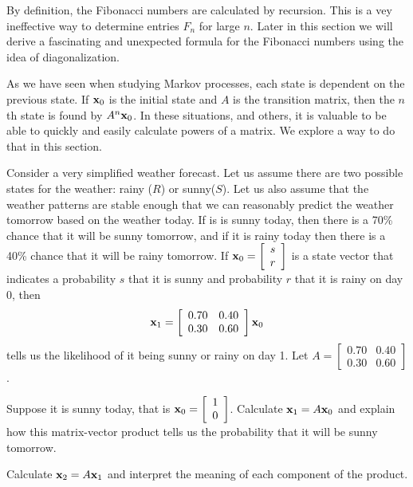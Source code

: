 By definition, the Fibonacci numbers are calculated by recursion. This is a vey ineffective way to determine entries $F_n$ for large $n$. Later in this section we will derive a fascinating and unexpected formula for the Fibonacci numbers using the idea of diagonalization. 



As we have seen when studying Markov processes, each state is dependent on the previous state. If $\mathbf{x}_0$ is the initial state and $A$ is the transition matrix, then the $n$th state is found by $A^n \mathbf{x}_0$. In these situations, and others, it is valuable to be able to quickly and easily calculate powers of a matrix. We explore a way to do that in this section. 

\begin{pa} \label{pa:4_c} Consider a very simplified weather forecast. Let us assume there are two possible states for the weather: rainy ($R$) or sunny($S$). Let us also assume that the weather patterns are stable enough that we can reasonably predict the weather tomorrow based on the weather today. If is is sunny today, then there is a 70\% chance that it will be sunny tomorrow, and if it is rainy today then there is a 40\% chance that it will be rainy tomorrow. If $\mathbf{x}_0 = \left[ \begin{array}{c} s \\ r \end{array} \right]$ is a state vector that indicates a probability $s$ that it is sunny and probability $r$ that it is rainy on day $0$, then 
\[\mathbf{x}_1 = \left[ \begin{array}{cc} 0.70&0.40 \\ 0.30&0.60 \end{array} \right] \mathbf{x}_0\]
tells us the likelihood of it being sunny or rainy on day 1. Let $A = \left[ \begin{array}{cc} 0.70&0.40 \\ 0.30&0.60 \end{array} \right]$.  
\be
\item Suppose it is sunny today, that is $\mathbf{x}_0 = \left[ \begin{array}{c} 1 \\ 0 \end{array} \right]$. Calculate $\mathbf{x}_1 = A \mathbf{x}_0$ and explain how this matrix-vector product tells us the probability that it will be sunny tomorrow.

\item Calculate $\mathbf{x}_2 = A\mathbf{x}_1$ and interpret the meaning of each component of the product.  


\end{pa}

